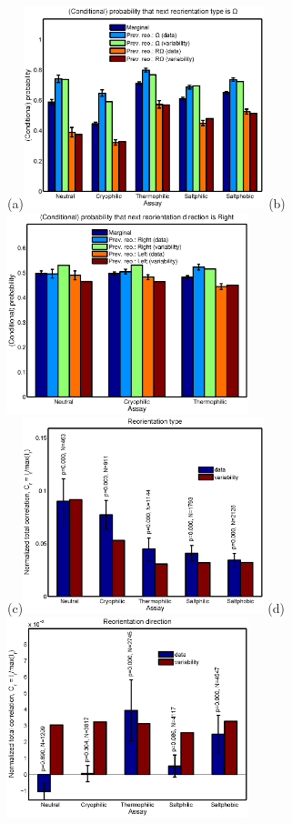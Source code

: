 \documentclass[12pt]{article}
\begin{document}
\begin{figure}
  \begin{center}
    (a)\includegraphics[width=7cm]{cond_type.eps}
    (b)\includegraphics[width=7cm]{cond_dir.eps}\\[1cm]
    (c)\includegraphics[width=7cm]{reotype_bin.eps}
    (d)\includegraphics[width=7cm]{reoangle_bin.eps}

\end{center}
\end{figure}
\end{document}
